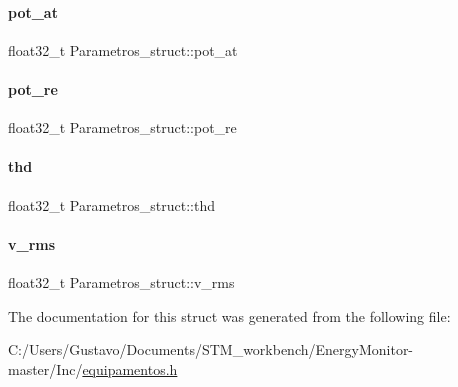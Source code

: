 \paragraph{\texorpdfstring{pot\+\_\+at}{pot\_at}}
{\footnotesize\ttfamily float32\+\_\+t Parametros\+\_\+struct\+::pot\+\_\+at}

\mbox{\label{struct_parametros__struct_ad0b178bff9c6d8a10b0923cdb31a54c7}} 
\paragraph{\texorpdfstring{pot\+\_\+re}{pot\_re}}
{\footnotesize\ttfamily float32\+\_\+t Parametros\+\_\+struct\+::pot\+\_\+re}

\mbox{\label{struct_parametros__struct_a70338ea8566d2c1ac4948eb1bc20a7ee}} 
\paragraph{\texorpdfstring{thd}{thd}}
{\footnotesize\ttfamily float32\+\_\+t Parametros\+\_\+struct\+::thd}

\mbox{\label{struct_parametros__struct_a7f95700e6a3755a1716cb194dfa53c87}} 
\paragraph{\texorpdfstring{v\+\_\+rms}{v\_rms}}
{\footnotesize\ttfamily float32\+\_\+t Parametros\+\_\+struct\+::v\+\_\+rms}



The documentation for this struct was generated from the following file\+:\begin{DoxyCompactItemize}
\item 
C\+:/\+Users/\+Gustavo/\+Documents/\+S\+T\+M\+\_\+workbench/\+Energy\+Monitor-\/master/\+Inc/\hyperlink{equipamentos_8h}{equipamentos.\+h}\end{DoxyCompactItemize}
